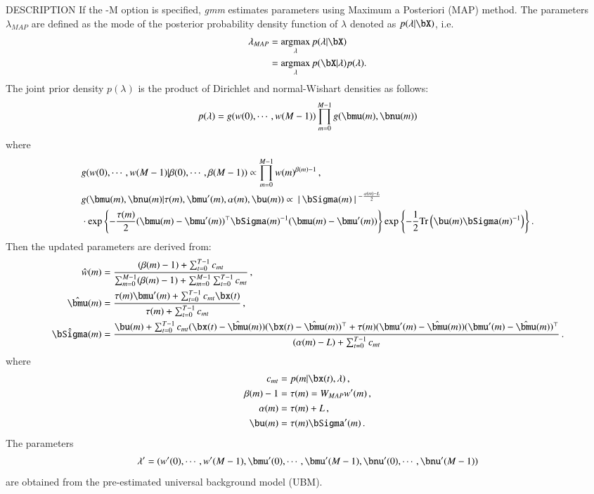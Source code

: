 \begin{qsection}{DESCRIPTION}
If the -M option is specified, {\em gmm} estimates parameters using Maximum a Posteriori (MAP) method. The parameters $\lambda_{MAP}$ are defined as the mode of the posterior probability density function of $\lambda$ denoted as $p(\lambda|\bX)$, i.e.
\begin{align}
 \lambda_{MAP} &= \argmax_{\lambda} p(\lambda | \bX) \notag \\
               &= \argmax_{\lambda} p(\bX | \lambda) p(\lambda). \notag
\end{align}
The joint prior density $p(\lambda)$ is the product of Dirichlet and normal-Wishart densities as follows:
\begin{displaymath}
 p(\lambda) = g(w(0),\cdots,w(M-1))\prod^{M-1}_{m=0} g(\bmu(m),\bnu(m))
\end{displaymath}
where 
\begin{align}
 &g(w(0),\cdots,w(M-1)|\beta(0),\cdots,\beta(M-1)) \propto \prod^{M-1}_{m=0} w(m)^{\beta(m)-1} \, , \notag \\
 &g(\bmu(m),\bnu(m)|\tau(m),\bmu'(m),\alpha(m),\bu(m)) \propto \mid \bSigma(m) \mid^{-\frac{\alpha(m)-L}{2}} \notag \\
 &\cdot \exp \left\{ -\frac{\tau(m)}{2}(\bmu(m)-\bmu'(m))^\top \bSigma(m)^{-1} (\bmu(m)-\bmu'(m)) \right\} \exp \left\{ -\frac{1}{2}\mathrm{Tr}\left( \bu(m) \bSigma(m)^{-1} \right) \right\}. \notag
\end{align}
Then the updated parameters are derived from:
\begin{align}
 \hat{w}(m)&=\frac{(\beta(m)-1)+\sum^{T-1}_{t=0}c_{mt}}{\sum^{M-1}_{m=0}(\beta(m)-1) + \sum^{M-1}_{m=0}\sum^{T-1}_{t=0}c_{mt}} \, ,\notag \\
 \hat{\bmu}(m)&=\frac{\tau(m)\bmu'(m)+\sum^{T-1}_{t=0}c_{mt}\bx(t)}{\tau(m)+\sum^{T-1}_{t=0}c_{mt}} \, ,\notag \\
 \hat{\bSigma}(m)&=\frac{\bu(m)+\sum^{T-1}_{t=0}c_{mt}(\bx(t)-\hat{\bmu}(m))(\bx(t)-\hat{\bmu}(m))^\top + \tau(m)(\bmu'(m)-\hat{\bmu}(m))(\bmu'(m)-\hat{\bmu}(m))^\top}{(\alpha(m)-L) + \sum^{T-1}_{t=0}c_{mt}} \, . \notag
\end{align}
where
\begin{align}
 c_{mt} &= p(m|\bx(t),\lambda) \, , \notag \\
 \beta(m)-1 &= \tau(m) = W_{MAP} w'(m) \, , \notag \\ 
 \alpha(m) &= \tau(m) + L \notag \, , \\
 \bu(m) &= \tau(m) \bSigma'(m) \, . \notag
\end{align}
The parameters 
 \begin{displaymath}
  \lambda'=(w'(0),\cdots,w'(M-1), \bmu'(0),\cdots,\bmu'(M-1), \bnu'(0),\cdots,\bnu'(M-1))
 \end{displaymath}
are obtained from the pre-estimated universal background model (UBM).
\end{qsection}

